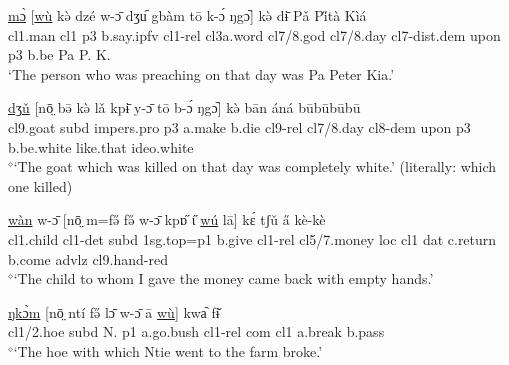 \documentclass[10pt,twoside]{article}
\newcommand{\gl}[1]{`#1'}
\def\VSP{\vspace{0pt}}
\newcommand{\cl}[1]{{\sc cl#1}}
\def\elicited{$^\diamond$}
\def\ih{ɩ}
\begin{document}
\begin{exe}
	\ex \label{exThePersonWhoWasPreaching1} 		
		\gll \uline{mɔ̀} [\uline{wù} kə̀ dzé w-ɔ̄ dʒu᷇ gbàm tō k-ɔ́ ŋgɔ᷆] kə̀ dɨ̄ Pǎ Pi̋tà Kìá\\
		\cl1.man	\cl1 	{\sc p3}	b.say.{\sc ipfv}	\cl1-{\sc rel}	\cl3a.word \cl7/8.god	\cl7/8.day	\cl7-{\sc dist.dem}	 upon	{\sc p3}	b.be	Pa P. K. \\
		\glt \VSP \gl{The person who was preaching on that day was Pa Peter Kia.}
\end{exe}%
\begin{exe} 
	\ex \label{exGoatTheyKilled}	

		\gll	\uline{dʒǔ} [nō̤ bə̄ kə̀ lǎ kpɨ̄ y-ɔ̄ tō b-ɔ́ ŋgɔ᷆] kə̀ bān áná būbūbūbū			\\
			\cl9.goat {\sc subd} {\sc impers.pro} {\sc p3} a.make b.die \cl9-{\sc rel} \cl7/8.day \cl8-{\sc dem} upon {\sc p3} b.be.white like.that {\sc ideo}.white		\\
		\glt \VSP \elicited \gl{The goat which was killed on that day was completely white.} (literally: which one killed)
\end{exe}%

\begin{exe}
	\ex \label{exChildWhomIGaveMoney}	

		\gll	\uline{wàn} w-ɔ̄ [nō̤ m=fə̋ fə̋ w-ɔ̄ kpɒ̋ {\H\ih} \uline{wú} lā] kɛ́ tʃǔ a̋ kè-kè	\\
			\cl1.child \cl1-{\sc det} {\sc subd} {\sc 1sg.top}={\sc p1} b.give	\cl1-{\sc rel} \cl5/7.money {\sc loc} \cl1 {\sc dat} c.return b.come {\sc advlz} \cl9.hand-{\sc red} 				\\
		\glt \VSP \elicited \gl{The child to whom I gave the money came back with empty hands.}

\end{exe}%

\begin{exe}
	\ex \label{exTheHoeWithWhich}	
		\gll	\uline{ŋkɔ̀m} [nō̤ ntí fə̋ lɔ̄ w-ɔ̄ ā \uline{wù}] kwa᷆ fɨ̌  	\\
			\cl1/2.hoe {\sc subd} N. {\sc p1} a.go.bush	\cl1-{\sc rel} {\sc com} \cl1 a.break b.pass 				\\
		\glt \VSP \elicited \gl{The hoe with which Ntie went to the farm broke.}
\end{exe}
\end{document}
